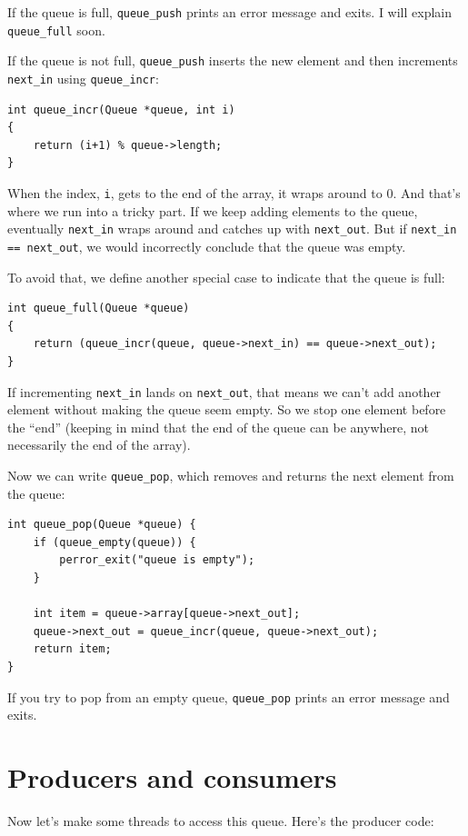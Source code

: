 \documentclass[12pt]{book}
\begin{document}
If the queue is full, \verb"queue_push" prints an error message
and exits.  I will explain \verb"queue_full" soon.

If the queue is not full, \verb"queue_push" inserts the new
element and then increments \verb"next_in" using \verb"queue_incr":

\begin{verbatim}
int queue_incr(Queue *queue, int i)
{
    return (i+1) % queue->length;
}
\end{verbatim}

When the index, {\tt i}, gets to the end of the array, it wraps around
to 0.  And that's where we run into a tricky part.  If we keep adding
elements to the queue, eventually \verb"next_in" wraps around and catches
up with \verb"next_out".  But if \verb"next_in == next_out", we would
incorrectly conclude that the queue was empty.

To avoid that, we define another special case to indicate that the
queue is full:

\begin{verbatim}
int queue_full(Queue *queue)
{
    return (queue_incr(queue, queue->next_in) == queue->next_out);
}
\end{verbatim}

If incrementing \verb"next_in" lands on \verb"next_out", that means
we can't add another element without making the queue seem empty.  So
we stop one element before the ``end'' (keeping in mind that the end of
the queue can be anywhere, not necessarily the end of the array).

Now we can write \verb"queue_pop", which removes and returns the next
element from the queue:

\begin{verbatim}
int queue_pop(Queue *queue) {
    if (queue_empty(queue)) {
        perror_exit("queue is empty");
    }
  
    int item = queue->array[queue->next_out];
    queue->next_out = queue_incr(queue, queue->next_out);
    return item;
}
\end{verbatim}

If you try to pop from an empty queue, \verb"queue_pop" prints
an error message and exits.


\section{Producers and consumers}
\label{prodcon}

Now let's make some threads to access this queue.  Here's the
producer code:
\end{document}
